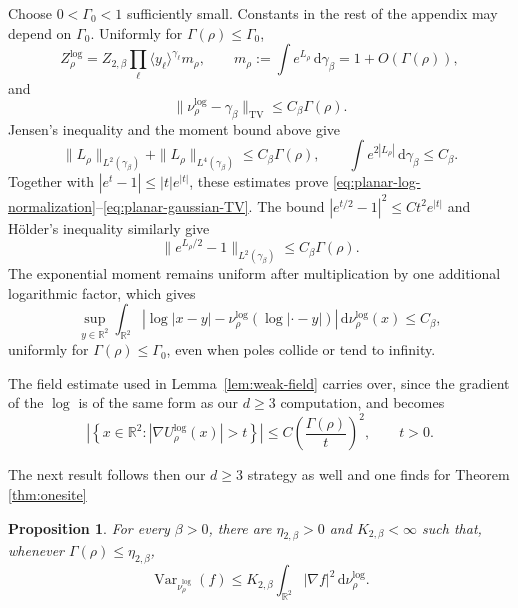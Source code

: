 \documentclass[12pt,reqno,letterpaper]{amsart}
\newtheorem{proposition}[theorem]{Proposition}
\theoremstyle{definition}
\theoremstyle{remark}
\numberwithin{equation}{section}
\newcommand{\R}{\mathbb R}
\newcommand{\dd}{\,\mathrm d}
\newcommand{\be}{\beta}
\newcommand{\Var}{\operatorname{Var}}
\newcommand{\TV}{\mathrm{TV}}
\begin{document}
\begin{appendix}
Choose \(0<\Gamma_0<1\) sufficiently small.  Constants in the rest of the
appendix may depend on \(\Gamma_0\).  Uniformly for
\(\Gamma(\rho)\le\Gamma_0\),
\begin{equation}\label{eq:planar-log-normalization}
 Z_\rho^{\log}
 =Z_{2,\be}\prod_\ell\langle y_\ell\rangle^{\gamma_\ell}m_\rho,
 \qquad
 m_\rho:=\int e^{L_\rho}\dd\gamma_\be=1+O(\Gamma(\rho)),
\end{equation}
and
\begin{equation}\label{eq:planar-gaussian-TV}
 \|\nu_\rho^{\log}-\gamma_\be\|_{\TV}
 \le C_\be\Gamma(\rho).
\end{equation}
Jensen's inequality and the moment bound above give
\[
 \|L_\rho\|_{L^2(\gamma_\be)}+
 \|L_\rho\|_{L^4(\gamma_\be)}
 \le C_\be\Gamma(\rho),
 \qquad
 \int e^{2|L_\rho|}\dd\gamma_\be\le C_\be.
\]
Together with \(|e^t-1|\le|t|e^{|t|}\), these estimates prove
\eqref{eq:planar-log-normalization}--\eqref{eq:planar-gaussian-TV}.  The bound
\(|e^{t/2}-1|^2\le C t^2e^{|t|}\) and H\"older's inequality similarly give
\begin{equation}\label{eq:planar-ground-state-convergence}
 \|e^{L_\rho/2}-1\|_{L^2(\gamma_\be)}
 \le C_\be\Gamma(\rho).
\end{equation}
The exponential moment remains uniform after multiplication by one additional
logarithmic factor, which gives
\begin{equation}\label{eq:planar-centered-log}
 \sup_{y\in\R^2}
 \int_{\R^2}
 \left|\log|x-y|-\nu_\rho^{\log}(\log|\cdot-y|)\right|
 \dd\nu_\rho^{\log}(x)
 \le C_\be,
\end{equation}
uniformly for \(\Gamma(\rho)\le\Gamma_0\), even when poles collide or tend to
infinity.

The field estimate used in Lemma~\ref{lem:weak-field} carries over, since the gradient of the $\log$ is of the same form as our $d\ge 3$ computation, and becomes
\begin{equation}\label{eq:planar-weak-field}
 \left|\left\{x\in\R^2:
 |\nabla U_\rho^{\log}(x)|>t\right\}\right|
 \le C\left(\frac{\Gamma(\rho)}t\right)^2,
 \qquad t>0.
\end{equation}

The next result follows then our $d\ge 3$ strategy as well and one finds for Theorem \ref{thm:onesite}

\begin{proposition}\label{prop:planar-one-site}
For every \(\be>0\), there are \(\eta_{2,\be}>0\) and
\(K_{2,\be}<\infty\) such that, whenever
\(\Gamma(\rho)\le\eta_{2,\be}\),
\begin{equation}\label{eq:planar-one-site-input}
 \Var_{\nu_\rho^{\log}}(f)
 \le K_{2,\be}
 \int_{\R^2}|\nabla f|^2\dd\nu_\rho^{\log}.
\end{equation}
\end{proposition}


\end{appendix}
\end{document}
